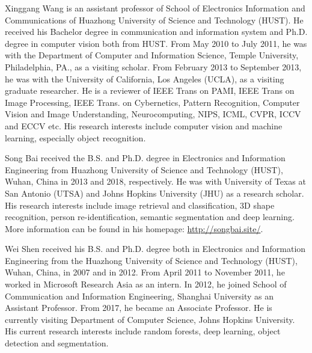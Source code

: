 \documentclass[10pt,journal,compsoc]{IEEEtran}
\begin{document}
\begin{IEEEbiography}{Xinggang Wang}
is an assistant professor of School of Electronics Information and Communications of Huazhong University of Science and Technology (HUST). He received his Bachelor degree in communication and information system and Ph.D. degree in computer vision both from HUST. From May 2010 to July 2011, he was with the Department of Computer and Information Science, Temple University, Philadelphia, PA., as a visiting scholar. From February 2013 to September 2013, he was with the University of California, Los Angeles (UCLA), as a visiting graduate researcher. He is a reviewer of IEEE Trans on PAMI, IEEE Trans on Image Processing, IEEE Trans. on Cybernetics, Pattern Recognition, Computer Vision and Image Understanding, Neurocomputing, NIPS, ICML, CVPR, ICCV and ECCV etc. His research interests include computer vision and machine learning, especially object recognition.
\end{IEEEbiography}

\begin{IEEEbiography}{Song Bai}
received the B.S. and Ph.D. degree in Electronics and Information Engineering from Huazhong University of Science and Technology (HUST), Wuhan, China in 2013 and 2018, respectively. He was with University of Texas at San Antonio (UTSA) and Johns Hopkins University (JHU) as a research scholar. His research interests include image retrieval and classification, 3D shape recognition, person re-identification, semantic segmentation and deep learning. More information can be found in his homepage: \url{http://songbai.site/}.
\end{IEEEbiography}

\begin{IEEEbiography}{Wei Shen}
received his B.S. and Ph.D. degree both in Electronics and Information Engineering from the Huazhong University of Science and Technology (HUST), Wuhan, China, in 2007 and in 2012.
From April 2011 to November 2011, he worked in Microsoft Research Asia as an intern. In 2012, he joined School of Communication and Information Engineering, Shanghai University as an Assistant Professor. From 2017, he became an Associate Professor.
He is currently visiting Department of Computer Science, Johns Hopkins University.
His current research interests include random forests, deep learning, object detection and segmentation.
\end{IEEEbiography}
\end{document}
